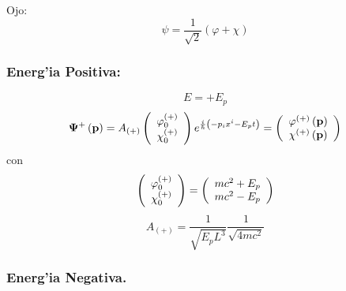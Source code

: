 Ojo:
\begin{equation}
\psi=\frac{1}{\sqrt{2}}\left(  \varphi+\chi\right)
\end{equation}


\subsubsection{Energ'ia Positiva:}%

\begin{equation}
E=+E_{p}%
\end{equation}
\begin{equation}
\mathbf{\Psi}^{+}\left(  \mathbf{p}\right)  =A_{\left(  +\right)  }\left(
\begin{array}
[c]{c}%
\varphi_{0}^{\left(  +\right)  }\\
\chi_{0}^{\left(  +\right)  }%
\end{array}
\right)  e^{\frac{i}{\hbar}\left(  -p_{i}x^{i}-E_{p}t\right)  }=\left(
\begin{array}
[c]{c}%
\varphi^{\left(  +\right)  }\left(  \mathbf{p}\right) \\
\chi^{\left(  +\right)  }\left(  \mathbf{p}\right)
\end{array}
\right)
\end{equation}
con
\begin{equation}
\left(
\begin{array}
[c]{c}%
\varphi_{0}^{\left(  +\right)  }\\
\chi_{0}^{\left(  +\right)  }%
\end{array}
\right)  =\left(
\begin{array}
[c]{c}%
mc^{2}+E_{p}\\
mc^{2}-E_{p}%
\end{array}
\right)
\end{equation}
\begin{equation}
A_{\left(  +\right)  }=\frac{1}{\sqrt{E_{p}L^{3}}}\frac{1}{\sqrt{4mc^{2}}}%
\end{equation}


\subsubsection{Energ'ia Negativa.}%

